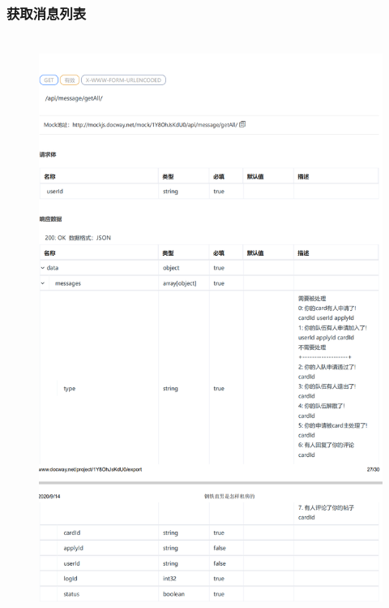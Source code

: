        \subsubsection{获取消息列表}
        \begin{figure}[h]
            \centering
            \includegraphics[height=19.0cm,width=14.0cm]{design/image/api29.png} 
            \end{figure}  
            \newpage
